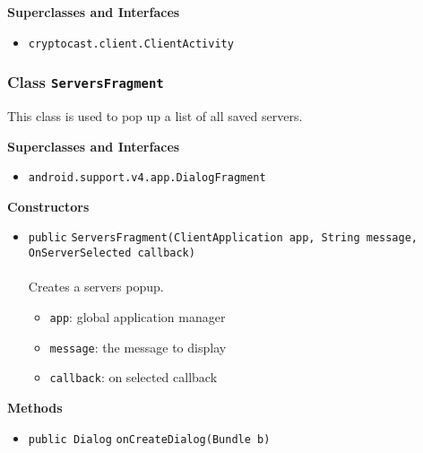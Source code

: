 \textbf{\sffamily Superclasses and Interfaces}
\begin{itemize}
\item \lstinline|cryptocast.client.ClientActivity|
\end{itemize}



\subsubsection{Class \lstinline|ServersFragment|}
This class is used to pop up a list of all saved servers. \\
\noindent\begin{minipage}[t]{5cm}
\vspace{0.3em}
\hspace*{2em}
\vspace{0.3em}
\end{minipage}



\textbf{\sffamily Superclasses and Interfaces}
\begin{itemize}
\item \lstinline|android.support.v4.app.DialogFragment|
\end{itemize}


\textbf{\sffamily Constructors}
\begin{itemize}
\item \lstinline|public| \lstinline|ServersFragment|\lstinline|(ClientApplication app, String message, OnServerSelected callback)|\\ \\[-0.6em]
Creates a servers popup.
\begin{itemize}
\item \lstinline|app|: global application manager
\item \lstinline|message|: the message to display
\item \lstinline|callback|: on selected callback
\end{itemize}



\end{itemize}


\textbf{\sffamily Methods}
\begin{itemize}
\item \lstinline|public Dialog| \lstinline|onCreateDialog|\lstinline|(Bundle b)| \\[-0.6em]




\end{itemize}

